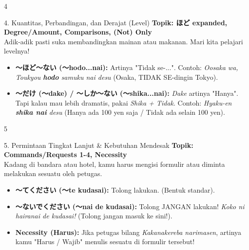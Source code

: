 \begin{convobox}{4}
    \noindent
      
      

    \vspace{1.5em}
\end{convobox}

\begin{lessonbox}{4. Kuantitas, Perbandingan, dan Derajat (Level)}
    \textbf{Topik: ほど expanded, Degree/Amount, Comparisons, (Not) Only} \\
    Adik-adik pasti suka membandingkan mainan atau makanan. Mari kita pelajari levelnya!
    \begin{itemize}
        \item \textbf{〜ほど〜ない (〜hodo...nai):} Artinya "Tidak se-...". Contoh: \textit{Oosaka wa, Toukyou \textbf{hodo} samuku nai desu} (Osaka, TIDAK SE-dingin Tokyo).
        \item \textbf{〜だけ (〜dake) / 〜しか〜ない (〜shika...nai):} \textit{Dake} artinya "Hanya". Tapi kalau mau lebih dramatis, pakai \textit{Shika + Tidak}. Contoh: \textit{Hyaku-en \textbf{shika nai} desu} (Hanya ada 100 yen saja / Tidak ada selain 100 yen).
    \end{itemize}
\end{lessonbox}

\begin{convobox}{5}
    \noindent
      
      

    \vspace{1.5em}
\end{convobox}

\begin{lessonbox}{5. Permintaan Tingkat Lanjut \& Kebutuhan Mendesak}
    \textbf{Topik: Commands/Requests 1-4, Necessity} \\
    Kadang di bandara atau hotel, kamu harus mengisi formulir atau diminta melakukan sesuatu oleh petugas.
    \begin{itemize}
        \item \textbf{〜てください (〜te kudasai):} Tolong lakukan. (Bentuk standar).
        \item \textbf{〜ないでください (〜nai de kudasai):} Tolong JANGAN lakukan! \textit{Koko ni hairanai de kudasai!} (Tolong jangan masuk ke sini!).
        \item \textbf{Necessity (Harus):} Jika petugas bilang \textit{Kakanakereba narimasen}, artinya kamu "Harus / Wajib" menulis sesuatu di formulir tersebut!
    \end{itemize}
\end{lessonbox}

